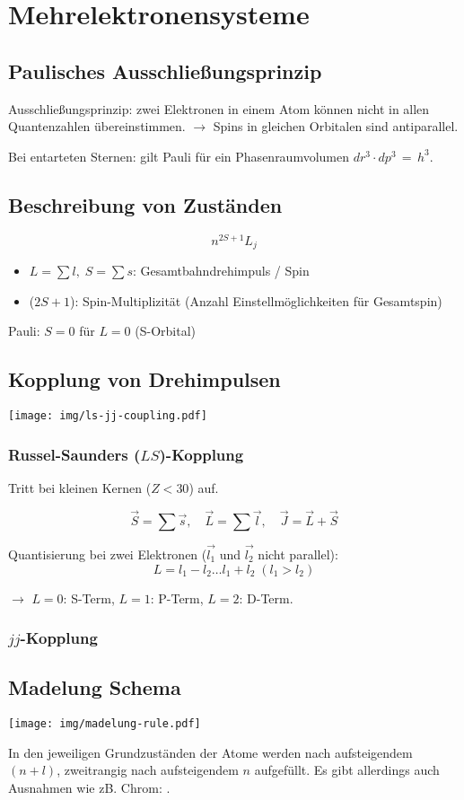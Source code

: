 \section{Mehrelektronensysteme}
\subsection{Paulisches Ausschließungsprinzip}
Ausschließungsprinzip: zwei Elektronen in einem Atom können nicht in allen Quantenzahlen übereinstimmen.
$\rightarrow$ Spins in gleichen Orbitalen sind antiparallel.

Bei entarteten Sternen: gilt Pauli für ein Phasenraumvolumen $dr^3 \cdot dp^3 \, = \, h^3$.

\subsection{Beschreibung von Zuständen}
\begin{equation*}
	n^{2S+1}L_j
\end{equation*}
\begin{itemize}
	\item $L = \sum l, \; S = \sum s$: Gesamtbahndrehimpuls / Spin
	\item ($2S + 1$): Spin-Multiplizität (Anzahl Einstellmöglichkeiten für Gesamtspin)
\end{itemize}
Pauli: $S = 0$ für $L = 0$ (S-Orbital)

\subsection{Kopplung von Drehimpulsen}
\begin{center}
	\texttt{[image: img/ls-jj-coupling.pdf]}
\end{center}

\subsubsection{Russel-Saunders ($LS$)-Kopplung}
Tritt bei kleinen Kernen ($Z < 30$) auf.

\[\vec{S} = \sum \vec{s}, \quad \vec{L} = \sum \vec{l}, \quad \vec{J} = \vec{L} + \vec{S}\]

Quantisierung bei zwei Elektronen ($\vec{l_1}$ und $\vec{l_2}$ nicht parallel): \[L = l_1 - l_2 \dots l_1 + l_2 \; (l_1 > l_2)\]

$\rightarrow$ $L=0$: S-Term, $L=1$: P-Term, $L=2$: D-Term.
\subsubsection{$jj$-Kopplung}

\subsection{Madelung Schema}
\begin{center}
\texttt{[image: img/madelung-rule.pdf]}
\end{center}
In den jeweiligen Grundzuständen der Atome werden nach aufsteigendem $(n + l)$, zweitrangig nach aufsteigendem $n$ aufgefüllt.
Es gibt allerdings auch Ausnahmen wie zB. Chrom: .
